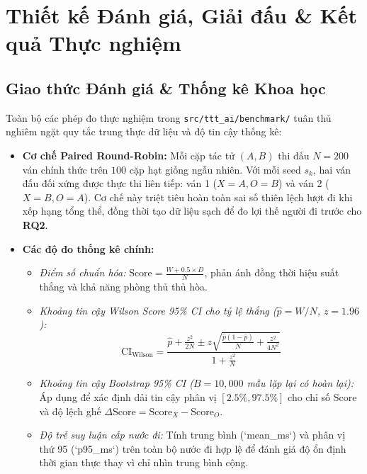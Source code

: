 \documentclass[a4paper,12pt]{report}
\begin{document}
\section{Thiết kế Đánh giá, Giải đấu \& Kết quả Thực nghiệm}

\subsection{Giao thức Đánh giá \& Thống kê Khoa học}
Toàn bộ các phép đo thực nghiệm trong \texttt{src/ttt\_\allowbreak ai/\allowbreak benchmark/} tuân thủ nghiêm ngặt quy tắc trung thực dữ liệu và độ tin cậy thống kê:
\begin{itemize}[leftmargin=1.2cm]
    \item \textbf{Cơ chế Paired Round-Robin:} Mỗi cặp tác tử $(A, B)$ thi đấu $N = 200$ ván chính thức trên $100$ cặp hạt giống ngẫu nhiên. Với mỗi seed $s_k$, hai ván đấu đối xứng được thực thi liên tiếp: ván 1 ($X = A, O = B$) và ván 2 ($X = B, O = A$). Cơ chế này triệt tiêu hoàn toàn sai số thiên lệch lượt đi khi xếp hạng tổng thể, đồng thời tạo dữ liệu sạch để đo lợi thế người đi trước cho \textbf{RQ2}.
    \item \textbf{Các độ đo thống kê chính:}
    \begin{itemize}
        \item \textit{Điểm số chuẩn hóa:} $\text{Score} = \frac{W + 0.5 \times D}{N}$, phản ánh đồng thời hiệu suất thắng và khả năng phòng thủ thủ hòa.
        \item \textit{Khoảng tin cậy Wilson Score 95\% CI cho tỷ lệ thắng ($\hat{p} = W/N$, $z = 1.96$):}
        \begin{equation}
            \text{CI}_{\text{Wilson}} = \frac{\hat{p} + \frac{z^2}{2N} \pm z \sqrt{\frac{\hat{p}(1-\hat{p})}{N} + \frac{z^2}{4N^2}}}{1 + \frac{z^2}{N}}
        \end{equation}
        \item \textit{Khoảng tin cậy Bootstrap 95\% CI ($B = 10{,}000$ mẫu lặp lại có hoàn lại):} Áp dụng để xác định dải tin cậy phân vị $[2.5\%, 97.5\%]$ cho chỉ số $\text{Score}$ và độ lệch ghế $\Delta\text{Score} = \text{Score}_X - \text{Score}_O$.
        \item \textit{Độ trễ suy luận cấp nước đi:} Tính trung bình (`mean\_\allowbreak ms`) và phân vị thứ 95 (`p95\_\allowbreak ms`) trên toàn bộ nước đi hợp lệ để đánh giá độ ổn định thời gian thực thay vì chỉ nhìn trung bình cộng.
    \end{itemize}
\end{itemize}
\end{document}
